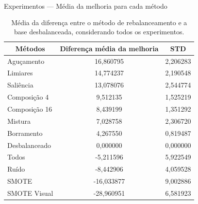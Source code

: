 \documentclass[10pt]{beamer}
\begin{document}
\begin{frame}{Experimentos --- Média da melhoria para cada método}
  \setlength\leftmargini{1em}
  \begin{table}
    \caption{Média da diferença entre o método de rebalanceamento e a base desbalanceada, considerando todos os experimentos.}
    \footnotesize{
    \begin{tabular}{|l|c|c|}
    \hline
    \multicolumn{1}{|c|}{\textbf{Métodos}} & \textbf{Diferença média da melhoria} & \textbf{STD} \\ \hline
    Aguçamento                             & 16,860795                            & 2,206283     \\ \hline
    Limiares                               & 14,774237                            & 2,190548     \\ \hline
    Saliência                              & 13,078076                            & 2,544774     \\ \hline
    Composição 4                           & 9,512135                             & 1,525219     \\ \hline
    Composição 16                          & 8,439199                             & 1,351292     \\ \hline
    Mistura                                & 7,028758                             & 2,306720     \\ \hline
    Borramento                             & 4,267550                             & 0,819487     \\ \hline
    Desbalanceado                          & 0,000000                             & 0,000000     \\ \hline
    Todos                                  & -5,211596                            & 5,922549     \\ \hline
    Ruído                                  & -8,442906                            & 4,059528     \\ \hline
    SMOTE                                  & -16,033877                           & 9,002886     \\ \hline
    SMOTE Visual                           & -28,960951                           & 6,581923     \\ \hline
    \end{tabular}
    }
  \end{table}
\end{frame}
\end{document}
